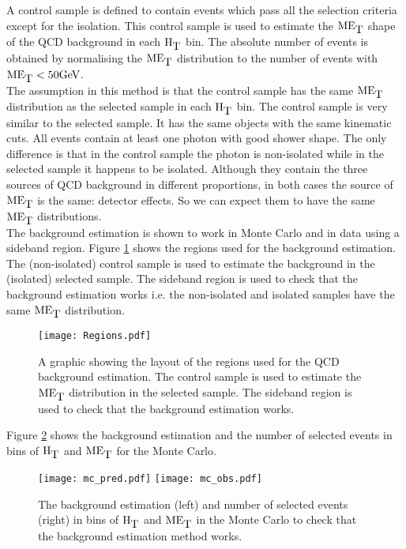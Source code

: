 A control sample is defined to contain events which pass all the selection 
criteria except for the isolation. This control sample is used to estimate the
$\mbox{ME}_{\mbox{T}}$ shape of the QCD background in each $\mbox{H}_{\mbox{T}}$ bin. The absolute number of
events is obtained by normalising the $\mbox{ME}_{\mbox{T}}$ distribution to the number of
events with $\mbox{ME}_{\mbox{T}} < 50 \mbox{GeV}$. \\

The assumption in this method is that the control sample has the same $\mbox{ME}_{\mbox{T}}$
distribution as the selected sample in each $\mbox{H}_{\mbox{T}}$ bin. The control sample is
very similar to the selected sample. It has the same objects with the same
kinematic cuts. All events contain at least one photon with good shower shape.
The only difference is that in the control sample the photon is non-isolated
while in the selected sample it happens to be isolated. Although they contain
the three sources of QCD background in different proportions, in both cases the 
source of $\mbox{ME}_{\mbox{T}}$ is the same: detector effects. So we can expect them to have 
the same $\mbox{ME}_{\mbox{T}}$ distributions. \\

The background estimation is shown to work in Monte Carlo and in data using a 
sideband region. Figure \ref{fig:Regions} shows the regions used for the
background estimation. The (non-isolated) control sample is used to estimate the 
background in the (isolated) selected sample. The sideband region is used to
check that the background estimation works i.e. the non-isolated and isolated 
samples have the same $\mbox{ME}_{\mbox{T}}$ distribution. \\

\begin{figure}
\begin{center}
\texttt{[image: Regions.pdf]}
\end{center}
\caption{A graphic showing the layout of the regions used for the QCD background
estimation. The control sample is used to estimate the $\mbox{ME}_{\mbox{T}}$ distribution in
the selected sample. The sideband region is used to check that the background
estimation works.}
\label{fig:Regions}
\end{figure}

Figure \ref{fig:Bkgd_Est_MC} shows the background estimation and the number of
selected events in bins of $\mbox{H}_{\mbox{T}}$ and $\mbox{ME}_{\mbox{T}}$ for the Monte Carlo. \\

\begin{figure}
\texttt{[image: mc\_pred.pdf]}
\texttt{[image: mc\_obs.pdf]}
\caption{The background estimation (left) and number of selected events (right) 
in bins of $\mbox{H}_{\mbox{T}}$ and $\mbox{ME}_{\mbox{T}}$ in the Monte Carlo to check that the background
estimation method works.}
\label{fig:Bkgd_Est_MC}
\end{figure}

